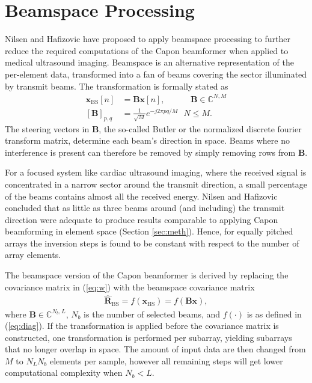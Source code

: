 \documentclass[journal]{IEEEtran}
\newcommand{\mat}[1]{\mathbf{#1}}
\renewcommand{\vec}[1]{\mathbf{#1}}
\begin{document}
\section{Beamspace Processing}\label{sec:bs}
Nilsen and Hafizovic \cite{Nilsen2009} have proposed to apply beamspace processing to further reduce the required computations of the Capon beamformer when applied to medical ultrasound imaging. Beamspace is an alternative representation of the per-element data, transformed into a fan of beams covering the sector illuminated by transmit beams. The transformation is formally stated as
\begin{align}
\vec{x}_\text{BS}[n] &= \mat{B}\vec{x}[n], \ \ \ \ \ \ \ \ \ \ \ \ \ \, \mat{B} \in \mathbb{C}^{N,M}\\
[\mat{B}]_{p,q} &= \frac{1}{\sqrt{M}}e^{-j 2 \pi p q / M} \ \ \ N \le M.
\end{align} 
The steering vectors in $\mat{B}$, the so-called Butler or the normalized discrete fourier transform matrix, determine each beam's direction in space. Beams where no interference is present can therefore be removed by simply removing rows from $\mat{B}$. 

For a focused system like cardiac ultrasound imaging, where the received signal is concentrated in a narrow sector around the transmit direction, a small percentage of the beams contains almost all the received energy. Nilsen and Hafizovic concluded that as little as three beams around (and including) the transmit direction were adequate to produce results comparable to applying Capon beamforming in element space (Section \ref{sec:meth}). Hence, for  equally pitched arrays the inversion steps is found to be constant with respect to the number of array elements.

The beamspace version of the Capon beamformer is derived by replacing the covariance matrix in (\ref{eq:w}) with the beamspace covariance matrix 
\begin{align}
\mat{\hat{R}}_\text{BS} = f(\vec{x}_\text{BS}) = f(\mat{B}\vec{x}), 
\end{align}
where $\mat{B} \in \mathbb{C}^{N_b,L}$, $N_b$ is the number of selected beams, and $f(\cdot)$ is as defined in (\ref{eq:diag}). If the transformation is applied before the covariance matrix is constructed, one transformation is performed per subarray, yielding subarrays that no longer overlap in space. The amount of input data are then changed from $M$ to $N_LN_b$ elements per sample, however all remaining steps will get lower computational complexity when $N_b < L$.
\end{document}

